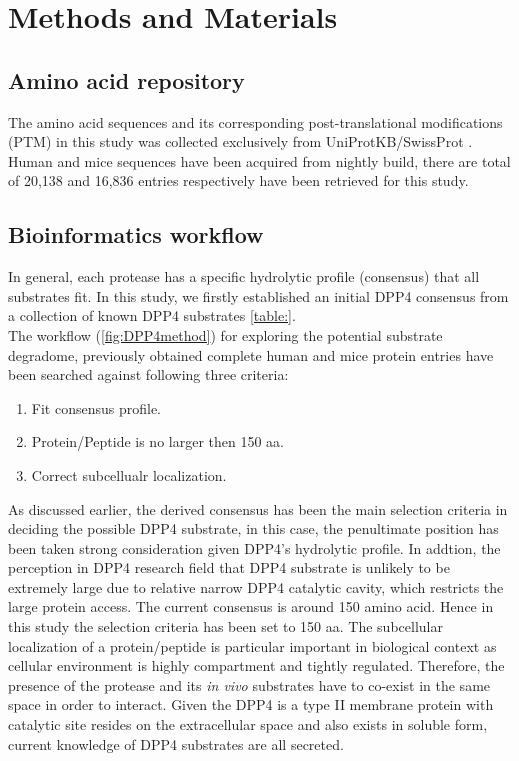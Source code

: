 \section{Methods and Materials}

\subsection{Amino acid repository}
The amino acid sequences and its corresponding post-translational modifications (PTM) in this study was collected exclusively from UniProtKB/SwissProt \cite{Magrane:2011fv}. Human and mice sequences have been acquired from nightly build, there are total of 20,138 and 16,836 entries respectively have been retrieved for this study. 
\\
\subsection{Bioinformatics workflow}
In general, each protease has a specific hydrolytic profile (consensus) that all substrates fit. In this study, we firstly established an initial DPP4 consensus from a collection of known DPP4 substrates \ref{table:}. 
\\
The workflow (\ref{fig:DPP4method}) for exploring the potential substrate degradome, previously obtained complete human and mice protein entries have been searched against following three criteria:
\begin{enumerate}
\item Fit consensus profile.
\item Protein/Peptide is no larger then 150 aa. 
\item Correct subcellualr localization.
\end{enumerate}

As discussed earlier, the derived consensus has been the main selection criteria in deciding the possible DPP4 substrate, in this case, the penultimate position has been taken strong consideration given DPP4's hydrolytic profile. In addtion, the perception in DPP4 research field that DPP4 substrate is unlikely to be extremely large due to relative narrow DPP4 catalytic cavity, which restricts the large protein access. The current consensus is around 150 amino acid. Hence in this study the selection criteria has been set to 150 aa. The subcellular localization of a protein/peptide is particular important in biological context as cellular environment is highly compartment and tightly regulated. Therefore, the presence of the protease and its \textit{in vivo} substrates have to co-exist in the same space in order to interact. Given the DPP4 is a type II membrane protein with catalytic site resides on the extracellular space and also exists in soluble form, current knowledge of DPP4 substrates are all secreted. 
\\
